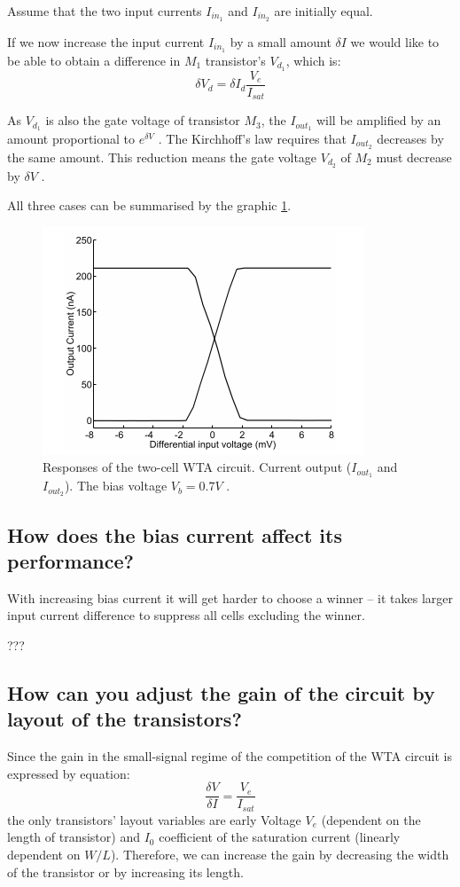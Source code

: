 \begin{enumerate}[label={I.}]
Assume that the two input currents $I_{in_1}$ and $I_{in_2}$ are initially equal. 

If we now increase the input current $I_{in_1}$ by a small amount $\delta I$ we would like to be able to obtain a difference in $M_1$ transistor's $V_{d_1}$, which is:
\begin{equation}
\delta V_d = \delta I_d \frac{V_e}{I_{sat}}
\end{equation}

As $V_{d_1}$ is also the gate voltage of transistor $M_3$, the $I_{out_1}$ will be amplified by an amount proportional to $e^{\delta V}$ . The Kirchhoff's law requires that
$I_{out_2}$ decreases by the same amount. This reduction means the gate voltage $V_{d_2}$ of $M_2$ must decrease by $\delta V$ \cite{book:VLSI}.
\end{enumerate}

All three cases can be summarised by the graphic \ref{fig:WTA_response}.

\begin{figure}[htbp]
  \centering
  \includegraphics[scale=0.9]{pics/WTA_response.jpg}
  \caption{Responses of the two-cell WTA circuit. Current output ($I_{out_1}$ and $I_{out_2}$). The bias voltage $V_b = 0.7V$ \cite{book:VLSI}.}
  \label{fig:WTA_response}
\end{figure} 

\subsection{How does the bias current affect its performance?}
With increasing bias current it will get harder to choose a winner -- it takes larger input current difference to suppress all cells excluding the winner. 

???
\subsection{How can you adjust the gain of the circuit by layout of the transistors?}
Since the gain in the small-signal regime of the competition of the WTA circuit is expressed by equation:
\begin{equation}
\frac{\delta V}{\delta I} = \frac{V_e}{I_{sat}} 
\end{equation}
the only transistors' layout variables are early Voltage $V_e$ (dependent on the length of transistor) and $I_0$ coefficient of the saturation current (linearly dependent on $W/L$). Therefore, we can increase the gain by decreasing the width of the transistor or by increasing its length. 

